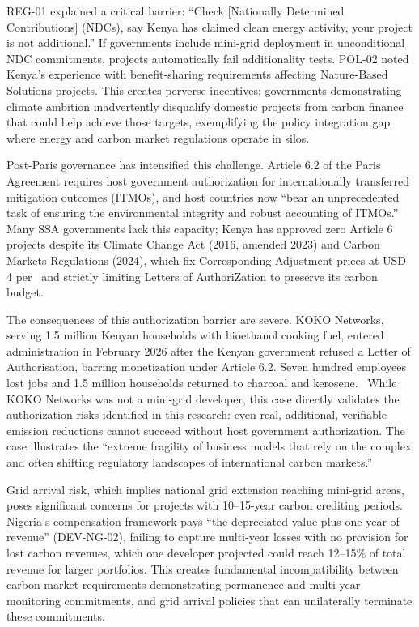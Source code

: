 REG-01 explained a critical barrier: ``Check [Nationally Determined Contributions] (NDCs), say Kenya has claimed clean energy activity, your project is not additional.'' If governments include mini-grid deployment in unconditional NDC commitments, projects automatically fail additionality tests. POL-02 noted Kenya's experience with benefit-sharing requirements affecting Nature-Based Solutions projects. This creates perverse incentives: governments demonstrating climate ambition inadvertently disqualify domestic projects from carbon finance that could help achieve those targets, exemplifying the policy integration gap where energy and carbon market regulations operate in silos.

Post-Paris governance has intensified this challenge. Article 6.2 of the Paris Agreement requires host government authorization for internationally transferred mitigation outcomes (ITMOs), and host countries now ``bear an unprecedented task of ensuring the environmental integrity and robust accounting of ITMOs.''~\cite{ahonen-governance} Many SSA governments lack this capacity; Kenya has approved zero Article 6 projects despite its Climate Change Act (2016, amended 2023) and Carbon Markets Regulations (2024), which fix Corresponding Adjustment prices at USD 4 per \tcooe\ and strictly limiting Letters of AuthoriZation to preserve its carbon budget.

The consequences of this authorization barrier are severe. KOKO Networks, serving 1.5 million Kenyan households with bioethanol cooking fuel, entered administration in February 2026 after the Kenyan government refused a Letter of Authorisation, barring monetization under Article 6.2. Seven hundred employees lost jobs and 1.5 million households returned to charcoal and kerosene.~\cite{koko-disrupt} While KOKO Networks was not a mini-grid developer, this case directly validates the authorization risks identified in this research: even real, additional, verifiable emission reductions cannot succeed without host government authorization. The case illustrates the ``extreme fragility of business models that rely on the complex and often shifting regulatory landscapes of international carbon markets.''~\cite{koko-econews}

Grid arrival risk, which implies national grid extension reaching mini-grid areas, poses significant concerns for projects with 10--15-year carbon crediting periods. Nigeria's compensation framework pays ``the depreciated value plus one year of revenue'' (DEV-NG-02), failing to capture multi-year losses with no provision for lost carbon revenues, which one developer projected could reach 12--15\% of total revenue for larger portfolios. This creates fundamental incompatibility between carbon market requirements demonstrating permanence and multi-year monitoring commitments, and grid arrival policies that can unilaterally terminate these commitments.

